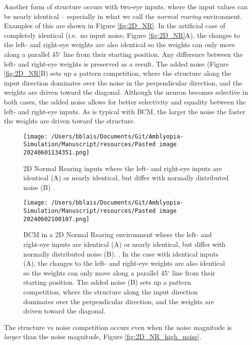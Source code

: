 \documentclass[
]{article}
\begin{document}
Another form of structure occurs with two-eye inputs, where the input
values can be nearly identical -- especially in what we call the
\emph{normal rearing} environment. Examples of this are shown in Figure
\ref{fig:2D_NR}. In the artificial case of completely identical (i.e.~no
input noise, Figure \ref{fig:2D_NR}A), the changes to the left- and
right-eye weights are also identical so the weights can only move along
a parallel 45\(^{\circ}\) line from their starting position. Any
difference between the left- and right-eye weights is preserved as a
result. The added noise (Figure \ref{fig:2D_NR}B) sets up a pattern
competition, where the structure along the input direction dominates
over the noise in the perpendicular direction, and the weights are
driven toward the diagonal. Although the neuron becomes selective in
both cases, the added noise allows for better selectivity and equality
between the left- and right-eye inputs. As is typical with BCM, the
larger the noise the faster the weights are driven toward the structure.

\begin{figure}
\centering
\texttt{[image: /Users/bblais/Documents/Git/Amblyopia-Simulation/Manuscript/resources/Pasted image 20240601134351.png]}
\caption{2D Normal Rearing inputs where the left- and right-eye inputs
are identical (A) or nearly identical, but differ with normally
distributed noise (B) .}\label{fig:2D_NR_inputs}
\end{figure}

\begin{figure}
\centering
\texttt{[image: /Users/bblais/Documents/Git/Amblyopia-Simulation/Manuscript/resources/Pasted image 20240602100107.png]}
\caption{BCM in a 2D Normal Rearing environment where the left- and
right-eye inputs are identical (A) or nearly identical, but differ with
normally distributed noise (B). . In the case with identical inputs (A),
the changes to the left- and right-eye weights are also identical so the
weights can only move along a parallel 45\(^{\circ}\) line from their
starting position. The added noise (B) sets up a pattern competition,
where the structure along the input direction dominates over the
perpendicular direction, and the weights are driven toward the
diagonal.}\label{fig:2D_NR_weights}
\end{figure}

The structure vs noise competition occurs even when the noise magnitude
is \emph{larger} than the noise magnitude, Figure
\ref{fig:2D_NR_high_noise}.
\end{document}
